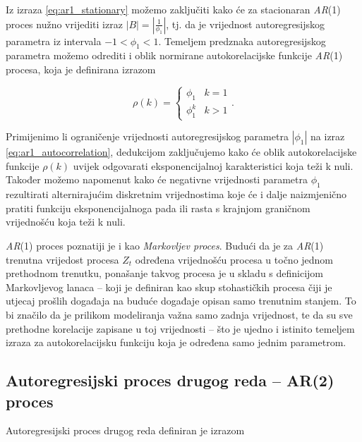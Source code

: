 \documentclass[a4paper,12pt,oneside]{memoir}
\begin{document}
                Iz izraza \eqref{eq:ar1_stationary} možemo zaključiti kako će za stacionaran \textit{AR}(1) proces nužno vrijediti izraz $\left|B\right|=\left|\frac{1}{\phi_1}\right|$, tj. da je vrijednost autoregresijskog parametra iz intervala $-1<\phi_1<1$. Temeljem predznaka autoregresijskog parametra možemo odrediti i oblik normirane autokorelacijske funkcije \textit{AR}(1) procesa, koja je definirana izrazom

                \begin{equation}
                    \rho(k)=
                    \begin{cases}
                        \phi_1 & k=1\\
                        \phi_1^k & k>1
                    \end{cases}.
                    \label{eq:ar1_autocorrelation}
                \end{equation}

                Primijenimo li ograničenje vrijednosti autoregresijskog parametra $\left|\phi_1\right|$ na izraz \eqref{eq:ar1_autocorrelation}, dedukcijom zaključujemo kako će oblik autokorelacijske funkcije $\rho(k)$ uvijek odgovarati eksponencijalnoj karakteristici koja teži k nuli. Također možemo napomenut kako će negativne vrijednosti parametra $\phi_1$ rezultirati alternirajućim diskretnim vrijednostima koje će i dalje naizmjenično pratiti funkciju eksponencijalnoga pada ili rasta s krajnjom graničnom vrijednošću koja teži k nuli.

                \textit{AR}(1) proces poznatiji je i kao \textit{Markovljev proces}. Budući da je za \textit{AR}(1) trenutna vrijedost procesa $Z_t$ određena vrijednošću procesa u točno jednom prethodnom trenutku, ponašanje takvog procesa je u skladu s definicijom Markovljevog lanaca -- koji je definiran kao skup stohastičkih procesa čiji je utjecaj prošlih događaja na buduće događaje opisan samo trenutnim stanjem. To bi značilo da je prilikom modeliranja važna samo zadnja vrijednost, te da su sve prethodne korelacije zapisane u toj vrijednosti -- što je ujedno i istinito temeljem izraza za autokorelacijsku funkciju koja je određena samo jednim parametrom.

            \subsection{Autoregresijski proces drugog reda -- AR(2) proces}

                Autoregresijski proces drugog reda definiran je izrazom
\end{document}

